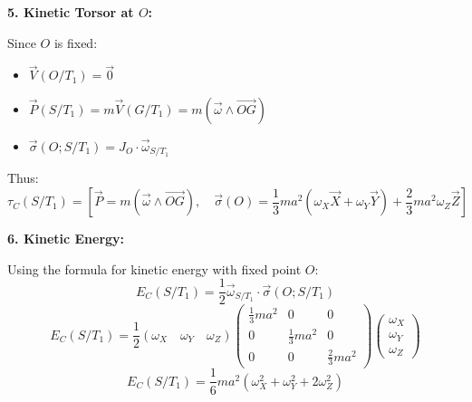 \documentclass[12pt]{article}
\begin{document}
\begin{correctionbox}
\textbf{5. Kinetic Torsor at $O$:}

Since $O$ is fixed:
\begin{itemize}
    \item $\vec{V}(O/T_1) = \vec{0}$
    \item $\vec{P}(S/T_1) = m \vec{V}(G/T_1) = m (\vec{\omega} \wedge \vec{OG})$
    \item $\vec{\sigma}(O; S/T_1) = J_O \cdot \vec{\omega}_{S/T_1}$
\end{itemize}

Thus:
\[
\tau_C(S/T_1) = \left[ \vec{P} = m (\vec{\omega} \wedge \vec{OG}),\quad \vec{\sigma}(O) = \frac{1}{3}ma^2(\omega_X \vec{X} + \omega_Y \vec{Y}) + \frac{2}{3}ma^2 \omega_Z \vec{Z} \right]
\]

\textbf{6. Kinetic Energy:}

Using the formula for kinetic energy with fixed point $O$:
\[
E_C(S/T_1) = \frac{1}{2} \vec{\omega}_{S/T_1} \cdot \vec{\sigma}(O; S/T_1)
\]
\[
E_C(S/T_1) = \frac{1}{2} \left( \omega_X \quad \omega_Y \quad \omega_Z \right)
\begin{pmatrix}
\frac{1}{3}ma^2 & 0 & 0 \\
0 & \frac{1}{3}ma^2 & 0 \\
0 & 0 & \frac{2}{3}ma^2
\end{pmatrix}
\begin{pmatrix}
\omega_X \\ \omega_Y \\ \omega_Z
\end{pmatrix}
\]
\[
E_C(S/T_1) = \frac{1}{6}ma^2 (\omega_X^2 + \omega_Y^2 + 2\omega_Z^2)
\]
\end{correctionbox}
\end{document}
